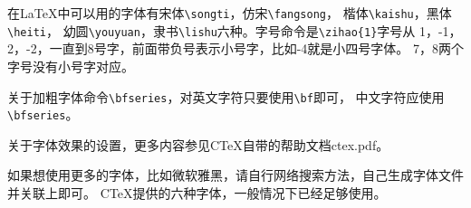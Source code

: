 在\LaTeX 中可以用的字体有{\songti 宋体}\verb+\songti+，{\fangsong 仿宋}\verb+\fangsong+，
{\kaishu 楷体}\verb+\kaishu+，{\heiti 黑体}\verb+\heiti+，
{\youyuan 幼圆}\verb+\youyuan+，{\lishu 隶书}\verb+\lishu+六种。字号命令是\verb+\zihao{1}+字号从
1，-1，2，-2，一直到8号字，前面带负号表示小号字，比如-4就是小四号字体。
7，8两个字号没有小号字对应。

关于加粗字体命令\verb+\bfseries+，对英文字符只要使用\verb+\bf+即可，
中文字符应使用\verb+\bfseries+。

关于字体效果的设置，更多内容参见CTeX自带的帮助文档ctex.pdf。

如果想使用更多的字体，比如微软雅黑，请自行网络搜索方法，自己生成字体文件并关联上即可。
CTeX提供的六种字体，一般情况下已经足够使用。


